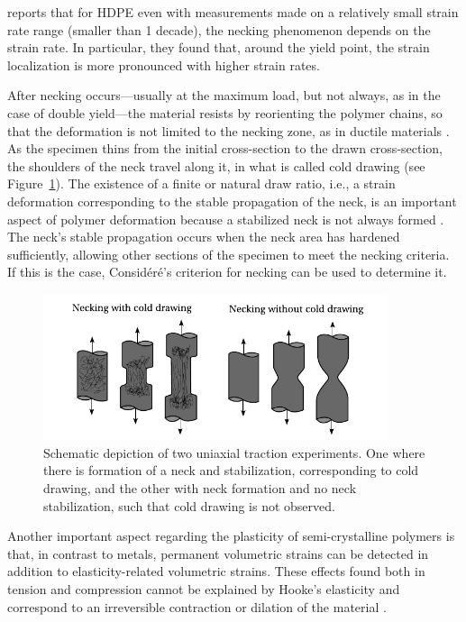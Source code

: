 \cite{yeKinematicStudyNecking2015} reports that for HDPE even with measurements made on a relatively small strain rate range (smaller than 1 decade), the necking phenomenon depends on the strain rate.
In particular, they found that, around the yield point, the strain localization is more pronounced with higher strain rates.

After necking occurs—usually at the maximum load, but not always, as in the case of double yield—the material resists by reorienting the polymer chains, so that the deformation is not limited to the necking zone, as in ductile materials \citep{callister2014materials}.
As the specimen thins from the initial cross-section to the drawn cross-section, the shoulders of the neck travel along it, in what is called cold drawing (see Figure~\ref{fig:natural_draw_ratio}).
The existence of a finite or natural draw ratio, i.e., a strain deformation corresponding to the stable propagation of the neck, is an important aspect of polymer deformation because a stabilized neck is not always formed \citep{wardIntroductionMechanicalProperties2004}.
The neck's stable propagation occurs when the neck area has hardened sufficiently, allowing other sections of the specimen to meet the necking criteria.
If this is the case, Considéré's criterion for necking can be used to determine it.
\begin{figure}[hbtp]
	\centering
	\includegraphics[width=0.9\textwidth]{figures/natural_draw_ratio}
	\caption{Schematic depiction of two uniaxial traction experiments. One where there is formation of a neck and stabilization, corresponding to cold drawing, and the other with neck formation and no neck stabilization, such that cold drawing is not observed.}
\label{fig:natural_draw_ratio}
\end{figure}

Another important aspect regarding the plasticity of semi-crystalline polymers is that, in contrast to metals, permanent volumetric strains can be detected in addition to elasticity-related volumetric strains.
These effects found both in tension and compression cannot be explained by Hooke's elasticity and correspond to an irreversible contraction or dilation of the material \citep{cangemiTwoPhaseModelMechanical2001,polanco-loriaConstitutiveModelThermoplastics2010}.

